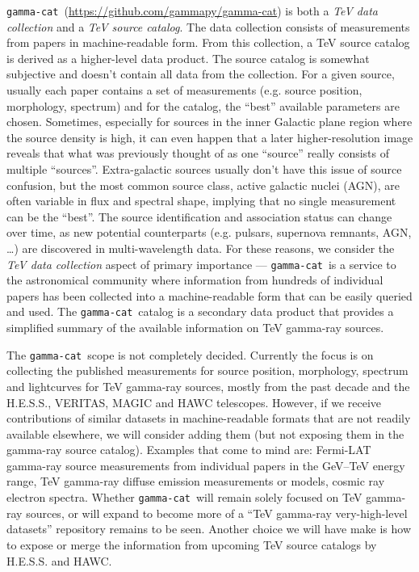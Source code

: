 \documentclass[11pt,twoside]{article}
\newcommand{\gammacat}{\texttt{gamma-cat}}
\newcommand{\gammacatgh}{\url{https://github.com/gammapy/gamma-cat}}
\begin{document}
\gammacat\ (\gammacatgh) is both a \emph{TeV data collection} and a \emph{TeV
source catalog}. The data collection consists of measurements from papers in
machine-readable form. From this collection, a TeV source catalog is derived as
a higher-level data product. The source catalog is somewhat subjective and
doesn't contain all data from the collection. For a given source, usually each
paper contains a set of measurements (e.g. source position, morphology,
spectrum) and for the catalog, the ``best'' available parameters are chosen.
Sometimes, especially for sources in the inner Galactic plane region where the
source density is high, it can even happen that a later higher-resolution image
reveals that what was previously thought of as one ``source'' really consists of
multiple ``sources''. Extra-galactic sources usually don't have this issue of
source confusion, but the most common source class, active galactic nuclei
(AGN), are often variable in flux and spectral shape, implying that no single
measurement can be the ``best''. The source identification and association
status can change over time, as new potential counterparts (e.g. pulsars,
supernova remnants, AGN, \ldots) are discovered in multi-wavelength data. For
these reasons, we consider the \emph{TeV data collection} aspect of primary
importance --- \gammacat\ is a service to the astronomical community where
information from hundreds of individual papers has been collected into a
machine-readable form that can be easily queried and used. The \gammacat\
catalog is a secondary data product that provides a simplified summary of the
available information on TeV gamma-ray sources.

The \gammacat\ scope is not completely decided. Currently the focus is on
collecting the published measurements for source position, morphology, spectrum
and lightcurves for TeV gamma-ray sources, mostly from the past decade and the
H.E.S.S., VERITAS, MAGIC and HAWC telescopes. However, if we receive
contributions of similar datasets in machine-readable formats that are not
readily available elsewhere, we will consider adding them (but not exposing them
in the gamma-ray source catalog). Examples that come to mind are: Fermi-LAT
gamma-ray source measurements from individual papers in the GeV--TeV energy
range, TeV gamma-ray diffuse emission measurements or models, cosmic ray
electron spectra. Whether \gammacat\ will remain solely focused on TeV gamma-ray
sources, or will expand to become more of a ``TeV gamma-ray very-high-level
datasets'' repository remains to be seen. Another choice we will have make is
how to expose or merge the information from upcoming TeV source catalogs by
H.E.S.S. and HAWC.
\end{document}
